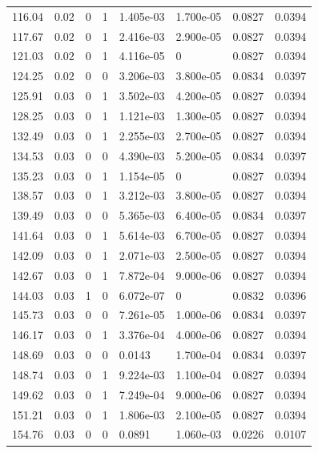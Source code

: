\documentclass[preview]{standalone}
\begin{document}
{{{\begin{tabular}{L{1.2cm}C{1.2cm} C{0.3cm}C{0.5cm} C{1.4cm}C{1.4cm} C{1.4cm}C{1.4cm}}
  116.04  &  0.02  & 0     &  1 &  1.405e-03  & 1.700e-05  & 0.0827 &  0.0394   \\ 
  117.67  &  0.02  & 0     &  1 &  2.416e-03  & 2.900e-05  & 0.0827 &  0.0394   \\ 
  121.03  &  0.02  & 0     &  1 &  4.116e-05  & 0  & 0.0827 &  0.0394   \\ 
  124.25  &  0.02  & 0     &  0 &  3.206e-03  & 3.800e-05  & 0.0834 &  0.0397   \\ 
  125.91  &  0.03  & 0     &  1 &  3.502e-03  & 4.200e-05  & 0.0827 &  0.0394   \\ 
  128.25  &  0.03  & 0     &  1 &  1.121e-03  & 1.300e-05  & 0.0827 &  0.0394   \\ 
  132.49  &  0.03  & 0     &  1 &  2.255e-03  & 2.700e-05  & 0.0827 &  0.0394   \\ 
  134.53  &  0.03  & 0     &  0 &  4.390e-03  & 5.200e-05  & 0.0834 &  0.0397   \\ 
  135.23  &  0.03  & 0     &  1 &  1.154e-05  & 0  & 0.0827 &  0.0394   \\ 
  138.57  &  0.03  & 0     &  1 &  3.212e-03  & 3.800e-05  & 0.0827 &  0.0394   \\ 
  139.49  &  0.03  & 0     &  0 &  5.365e-03  & 6.400e-05  & 0.0834 &  0.0397   \\ 
  141.64  &  0.03  & 0     &  1 &  5.614e-03  & 6.700e-05  & 0.0827 &  0.0394   \\ 
  142.09  &  0.03  & 0     &  1 &  2.071e-03  & 2.500e-05  & 0.0827 &  0.0394   \\ 
  142.67  &  0.03  & 0     &  1 &  7.872e-04  & 9.000e-06  & 0.0827 &  0.0394   \\ 
  144.03  &  0.03  & 1     &  0 &  6.072e-07  & 0  & 0.0832 &  0.0396   \\ 
  145.73  &  0.03  & 0     &  0 &  7.261e-05  & 1.000e-06  & 0.0834 &  0.0397   \\ 
  146.17  &  0.03  & 0     &  1 &  3.376e-04  & 4.000e-06  & 0.0827 &  0.0394   \\ 
  148.69  &  0.03  & 0     &  0 &  0.0143  & 1.700e-04  & 0.0834 &  0.0397   \\ 
  148.74  &  0.03  & 0     &  1 &  9.224e-03  & 1.100e-04  & 0.0827 &  0.0394   \\ 
  149.62  &  0.03  & 0     &  1 &  7.249e-04  & 9.000e-06  & 0.0827 &  0.0394   \\ 
  151.21  &  0.03  & 0     &  1 &  1.806e-03  & 2.100e-05  & 0.0827 &  0.0394   \\ 
  154.76  &  0.03  & 0     &  0 &  0.0891  & 1.060e-03  & 0.0226 &  0.0107   \\ 

\end{tabular}}}}
\end{document}
